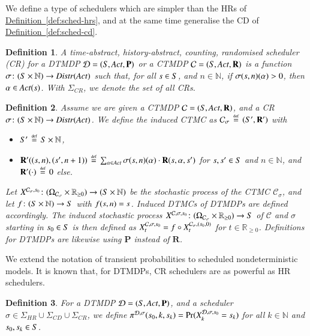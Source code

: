 \documentclass[10pt,twocolumn]{article}
\newtheorem{definition}{Definition}
\DeclareMathOperator{\prob}{Pr}
\newcommand{\states} {{\ensuremath S}}
\newcommand{\state}  {{\ensuremath s}}
\newcommand{\distrs} {{\ensuremath {\mathit{Distr}}}}
\newcommand{\nats}    {{\ensuremath {\mathbb{N}}}}
\newcommand{\reals}  {{\ensuremath {\mathbb{R}}}}
\newcommand{\sched}  {{\ensuremath {\sigma}}}
\newcommand{\acts}{\mathit{Act}}
\newcommand{\pmat}{\mathbf{P}}
\newcommand{\rmat}{\mathbf{R}}
\newcommand{\dmodel}{\mathcal{D}}
\newcommand{\cmodel}{\mathcal{C}}
\newcommand{\act}{\alpha}
\newcommand{\schedshr}{\Sigma_\mathit{HR}}
\newcommand{\schedscr}{\Sigma_\mathit{CR}}
\newcommand{\schedscd}{\Sigma_\mathit{CD}}
\newcommand{\stopro}{X}
\newcommand{\samspace}[1]{\Omega_{#1}}
\newcommand{\refdef}[1]{\texorpdfstring{\hyperref[def:#1]{Definition~\ref*{def:#1}}}{Definition \ref*{def:#1}}}
\newcommand{\defeq}{\,\stackrel{\mbox{\rm {\tiny def}}}{=}\,}
\newcommand{\tprob}{\pi}
\begin{document}
We define a type of schedulers which are simpler than the HRs of \refdef{sched-hrs}, and at the same time generalise the CD of \refdef{sched-cd}.
\begin{definition}
  \label{def:sched-cr}
A \emph{time-abstract, history-abstract, counting, randomised scheduler (CR)} for a DTMDP $\dmodel = (\states, \acts, \pmat)$ or a CTMDP $\cmodel = (\states, \acts, \rmat)$ is a function $\sched\colon (\states \times \nats) \to \distrs(\acts)$
  such that, for all $\state \in \states$, and $n \in \nats$, if $\sched(\state, n)(\act) > 0$, then $\act \in \acts(\state)$.
  With  $\schedscr$, we denote the set of all CRs.
\end{definition}

\begin{definition}
  \label{def:induced}
Assume we are given a CTMDP $\cmodel = (\states, \acts, \rmat)$, and a CR
  $\sched\colon (\states \times \nats) \to \distrs(\acts)$. We define the \emph{induced CTMC} as $\cmodel_\sched \defeq (\states', \rmat')$ with
\begin{itemize}
  \item $\states' \defeq \states \times \nats$,
  \item $\rmat'((\state, n), (\state', n+1)) \defeq \sum_{\act \in \acts} \sched(\state, n)(\act) \cdot \rmat(\state, \act, \state')$ for $\state, \state' \in \states$ and $n \in \nats$, and $\rmat'(\cdot) \defeq 0$ else.
  \end{itemize}
Let $\stopro^{\cmodel_\sched,\state_0}\colon (\samspace{\cmodel_\sched} \times \reals_{\geq 0}) \to (\states \times \nats)$ be the stochastic process of the CTMC $\cmodel_\sched$, and let $f\colon (\states \times \nats) \to \states$ with $f(\state, n) = \state$.
  Induced DTMCs of DTMDPs are defined accordingly.
  The \emph{induced stochastic process} $\stopro^{\cmodel,\sched,\state_0}\colon (\samspace{\cmodel_\sched} \times \reals_{\geq 0}) \to \states$ of $\cmodel$ and $\sched$ starting in $\state_0 \in \states$ is then defined as $\stopro^{\cmodel,\sched,\state_0}_t = f \circ \stopro^{\cmodel_\sched,(\state_0,0)}_t$ for $t \in \reals_{\geq 0}$.
  Definitions for DTMDPs are likewise using $\pmat$ instead of $\rmat$.
\end{definition}

We extend the notation of transient probabilities to scheduled nondeterministic models.
It is known that, for DTMDPs, CR schedulers are as powerful as HR schedulers.
\begin{definition}
  For a DTMDP $\dmodel = (\states, \acts, \pmat)$, and a scheduler $\sched \in \schedshr \cup \schedscd \cup \schedscr$,
  we define $\tprob^{\dmodel,\sched}(\state_0, k, \state_k) = \prob(\stopro^{\dmodel,\sched,\state_0}_k = \state_k)$ for all $k \in \nats$ and $\state_0, \state_k \in \states$.
\end{definition}
\end{document}
